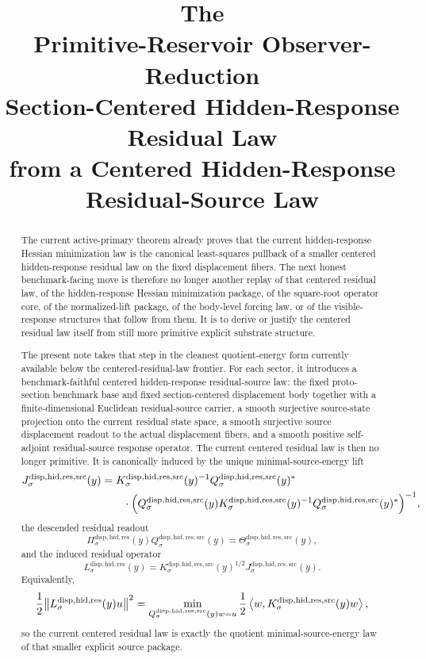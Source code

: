 \documentclass[11pt]{article}
\title{\textbf{The \TheoryName{}}\\[0.4em]
\large Primitive-Reservoir Observer-Reduction\\
\large Section-Centered Hidden-Response\\
\large Residual Law\\
\large from a Centered Hidden-Response\\
\large Residual-Source Law}
\author{}
\date{}
\newcommand{\ResidualReadout}[1]{\Pi_{#1}^{\mathrm{disp,hid,res}}}
\newcommand{\ResidualOperator}[1]{L_{#1}^{\mathrm{disp,hid,res}}}
\newcommand{\ResidualSourceProjection}[1]{Q_{#1}^{\mathrm{disp,hid,res,src}}}
\newcommand{\ResidualSourceReadout}[1]{\Theta_{#1}^{\mathrm{disp,hid,res,src}}}
\newcommand{\ResidualSourceOperator}[1]{K_{#1}^{\mathrm{disp,hid,res,src}}}
\newcommand{\ResidualSourceLift}[1]{J_{#1}^{\mathrm{disp,hid,res,src}}}
\begin{document}
\maketitle

\begin{abstract}
The current active-primary theorem already proves that the current hidden-response Hessian minimization law is the canonical least-squares pullback of a smaller centered hidden-response residual law on the fixed displacement fibers. The next honest benchmark-facing move is therefore no longer another replay of that centered residual law, of the hidden-response Hessian minimization package, of the square-root operator core, of the normalized-lift package, of the body-level forcing law, or of the visible-response structures that follow from them. It is to derive or justify the centered residual law itself from still more primitive explicit substrate structure.

The present note takes that step in the cleanest quotient-energy form currently available below the centered-residual-law frontier. For each sector, it introduces a benchmark-faithful centered hidden-response residual-source law: the fixed proto-section benchmark base and fixed section-centered displacement body together with a finite-dimensional Euclidean residual-source carrier, a smooth surjective source-state projection onto the current residual state space, a smooth surjective source displacement readout to the actual displacement fibers, and a smooth positive self-adjoint residual-source response operator. The current centered residual law is then no longer primitive. It is canonically induced by the unique minimal-source-energy lift
\[
\begin{aligned}
\ResidualSourceLift{\sigma}(y)
&=
\ResidualSourceOperator{\sigma}(y)^{-1}
\ResidualSourceProjection{\sigma}(y)^* \\
&\qquad\cdot
\Bigl(
\ResidualSourceProjection{\sigma}(y)
\ResidualSourceOperator{\sigma}(y)^{-1}
\ResidualSourceProjection{\sigma}(y)^*
\Bigr)^{-1},
\end{aligned}
\]
the descended residual readout
\[
\ResidualReadout{\sigma}(y)
\ResidualSourceProjection{\sigma}(y)
=
\ResidualSourceReadout{\sigma}(y),
\]
and the induced residual operator
\[
\ResidualOperator{\sigma}(y)
=
\ResidualSourceOperator{\sigma}(y)^{1/2}
\ResidualSourceLift{\sigma}(y).
\]
Equivalently,
\[
\frac{1}{2}\norm{\ResidualOperator{\sigma}(y)u}^{2}
=
\min_{\ResidualSourceProjection{\sigma}(y)w=u}
\frac{1}{2}
\ev{w,\ResidualSourceOperator{\sigma}(y)w},
\]
so the current centered residual law is exactly the quotient minimal-source-energy law of that smaller explicit source package.


\end{abstract}
\end{document}
